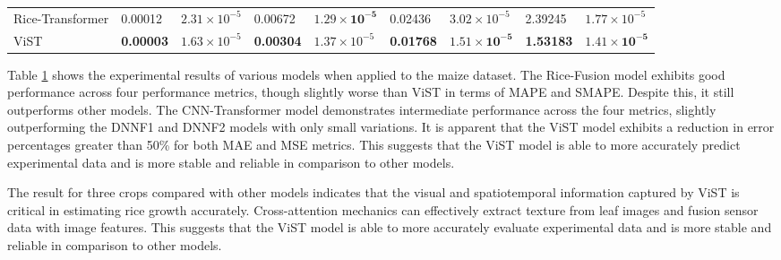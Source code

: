 \documentclass[acmsmall, screen]{acmart}
\begin{document}
\begin{table}[htbp]
{\begin{tabular}{lllllllll}
      Rice-Transformer & 0.00012 & \begin{math}2.31\times 10^{-5}\end{math} & 0.00672 & \begin{math}\mathbf{1.29\times 10^{-5}}\end{math} & 0.02436 & \begin{math}3.02\times 10^{-5}\end{math} & 2.39245 & \begin{math}1.77\times 10^{-5}\end{math} \\
      ViST  & \textbf{0.00003} & \begin{math}1.63\times 10^{-5}\end{math} & \textbf{0.00304} & \begin{math}1.37\times 10^{-5}\end{math} & \textbf{0.01768} & \begin{math}\mathbf{1.51\times 10^{-5}}\end{math} & \textbf{1.53183} & \begin{math}\mathbf{1.41\times 10^{-5}}\end{math} \\
      \bottomrule
      \end{tabular}%
  }
    
  \label{tab:maize_results}%
\end{table}%


Table \ref{tab:maize_results} shows the experimental results of various models when applied to the maize dataset. The Rice-Fusion model exhibits good performance across four performance metrics, though slightly worse than ViST in terms of MAPE and SMAPE. Despite this, it still outperforms other models. The CNN-Transformer model demonstrates intermediate performance across the four metrics, slightly outperforming the DNNF1 and DNNF2 models with only small variations. It is apparent that the ViST model exhibits a reduction in error percentages greater than 50\% for both MAE and MSE metrics. This suggests that the ViST model is able to more accurately predict experimental data and is more stable and reliable in comparison to other models.

The result for three crops compared with other models indicates that the visual and spatiotemporal information captured by ViST is critical in estimating rice growth accurately. Cross-attention mechanics can effectively extract texture from leaf images and fusion sensor data with image features.  This suggests that the ViST model is able to more accurately evaluate experimental data and is more stable and reliable in comparison to other models.
\end{document}
